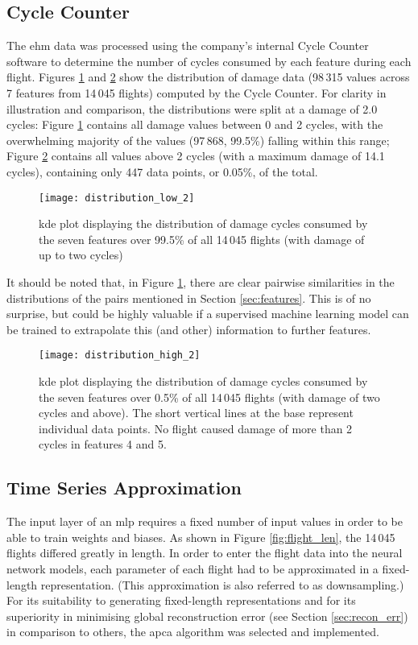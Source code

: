 \subsection{Cycle Counter} \label{sec:cyclecounter}
The \ac{ehm} data was processed using the company's internal Cycle Counter software to determine the number of cycles consumed by each feature during each flight. Figures \ref{fig:dmg_dist_low} and \ref{fig:dmg_dist_high} show the distribution of damage data (98\,315 values across 7 features from 14\,045 flights) computed by the Cycle Counter. For clarity in illustration and comparison, the distributions were split at a damage of 2.0 cycles: Figure \ref{fig:dmg_dist_low} contains all damage values between 0 and 2 cycles, with the overwhelming majority of the values (97\,868, 99.5\%) falling within this range; Figure \ref{fig:dmg_dist_high} contains all values above 2 cycles (with a maximum damage of 14.1 cycles), containing only 447 data points, or 0.05\%, of the total.

\begin{figure}
    \centering
    \texttt{[image: distribution\_low\_2]}
    \caption{\label{fig:dmg_dist_low} \ac{kde} plot displaying the distribution of damage cycles consumed by the seven features over 99.5\% of all 14\,045 flights (with damage of up to two cycles)}
\end{figure}

It should be noted that, in Figure \ref{fig:dmg_dist_low}, there are clear pairwise similarities in the distributions of the pairs mentioned in Section \ref{sec:features}. This is of no surprise, but could be highly valuable if a supervised machine learning model can be trained to extrapolate this (and other) information to further features.

\begin{figure}
    \centering
    \texttt{[image: distribution\_high\_2]}
    \caption{\label{fig:dmg_dist_high} \ac{kde} plot displaying the distribution of damage cycles consumed by the seven features over 0.5\% of all 14\,045 flights (with damage of two cycles and above). The short vertical lines at the base represent individual data points. No flight caused damage of more than 2 cycles in features 4 and 5.}
\end{figure}

\subsection{Time Series Approximation} \label{sec:downsample}
The input layer of an \ac{mlp} requires a fixed number of input values in order to be able to train weights and biases. As shown in Figure \ref{fig:flight_len}, the 14\,045 flights differed greatly in length. In order to enter the flight data into the neural network models, each parameter of each flight had to be approximated in a fixed-length representation. (This approximation is also referred to as downsampling.) For its suitability to generating fixed-length representations and for its superiority in minimising global reconstruction error (see Section \ref{sec:recon_err}) in comparison to others, the \ac{apca} algorithm \cite[]{keogh_locally_2002} was selected and implemented.

